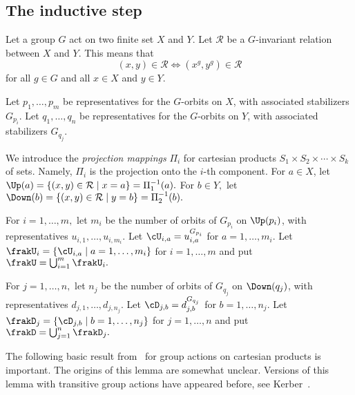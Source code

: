 

\subsection{The inductive step}
\label{subsec:inductivestep}



Let a group $G$ act on two finite set $X$ and $Y$. 
Let ${\mathcal R}$ be a $G$-invariant relation between $X$ and $Y.$ 
This means that 
$$
(x,y) \in {\mathcal R} \iff 
(x^g,y^g) \in {\mathcal R} 
$$
for all $g \in G$ and all $x \in X$ and $y \in Y$.

\bigskip

 
Let $p_1,\ldots,p_m$ be representatives for the $G$-orbits on $X$, with associated stabilizers $G_{p_i}.$ 
Let $q_1,\ldots,q_n$ be representatives for the $G$-orbits on $Y$, with associated stabilizers $G_{q_j}.$

\bigskip

We introduce the {\em projection mappings} $\Pi_i$ for 
cartesian products $S_1 \times S_2 \times \cdots \times S_k$ of sets. 
Namely, $\Pi_i$ is the projection onto the $i$-th component.
For $a \in X$, let $\Up(a) = \{ (x,y) \in {\mathcal R} \mid x = a \} = \Pi_1^{-1}(a).$
For $b \in Y,$ let $\Down(b) = \{ (x,y) \in {\mathcal R}  \mid y = b \}= \Pi_2^{-1}(b).$

\bigskip

For $i = 1,\ldots,m,$ let $m_i$ be the number of orbits of $G_{p_i}$ on $\Up(p_i)$, 
with representatives $u_{i,1}, \ldots, u_{i,m_i}.$
Let $\cU_{i,a} = u_{i,a}^{G_{p_i}}$ for $a=1,\ldots,m_i.$ 
Let $\frakU_i = \{ \cU_{i,a} \mid a=1,\ldots,m_i \}$ for $i=1,\ldots, m$ 
and put $\frakU = \bigcup_{i=1}^m \frakU_i.$

\bigskip

For $j = 1,\ldots,n,$ let $n_j$ be the number of orbits of $G_{q_j}$ on $\Down(q_j)$, 
with representatives $d_{j,1}, \ldots, d_{j,n_j}.$
Let $\cD_{j,b} = d_{j,b}^{G_{q_j}}$ for $b=1,\ldots,n_j.$ 
Let 
$\frakD_j = \{ \cD_{j,b} \mid b=1,\ldots,n_j \}$ for $j=1,\ldots,n$ 
and put $\frakD = \bigcup_{j=1}^n \frakD_j.$



\bigskip

The following basic result from~\cite{BettenBLT} 
for group actions on cartesian products is important. 
The origins of this lemma are somewhat unclear. 
Versions of this lemma with transitive group actions 
have appeared before, see Kerber~\cite[1.2.15]{Kerber99}.

